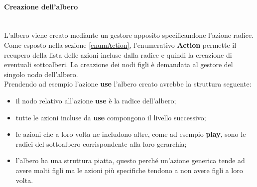 \documentclass[12pt,a4paper,twoside]{book}
\begin{document}
\paragraph{Creazione dell'albero}\mbox{}\\
L'albero viene creato mediante un gestore apposito specificandone l'azione radice. Come esposto nella sezione \ref{enumAction}, l'enumerativo \textbf{Action} permette il recupero della lista delle azioni incluse dalla radice e quindi la creazione di eventuali sottoalberi. La creazione dei nodi figli è demandata al gestore del singolo nodo dell'albero.\\
Prendendo ad esempio l'azione \textbf{use} l'albero creato avrebbe la struttura seguente:
\begin{itemize}
\item il nodo relativo all'azione \textbf{use} è la radice dell'albero;
\item tutte le azioni incluse da \textbf{use} compongono il livello successivo;
\item le azioni che a loro volta ne includono altre, come ad esempio \textbf{play}, sono le radici del sottoalbero corrispondente alla loro gerarchia;
\item l'albero ha una struttura piatta, questo perché un'azione generica tende ad avere molti figli ma le azioni più specifiche tendono a non avere figli a loro volta.
\end{itemize}
\end{document}
